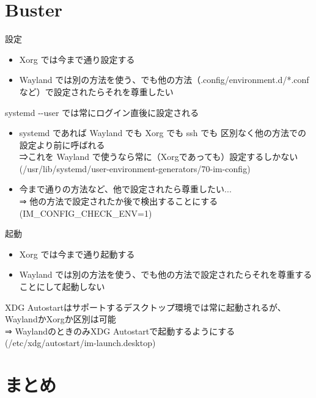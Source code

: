 \section{Buster}

\begin{frame}{設定}

\begin{itemize}
 \item Xorg では今まで通り設定する
 \item Wayland では別の方法を使う、でも他の方法（.config/environment.d/*.confなど）で設定されたらそれを尊重したい
\end{itemize}
\pause

systemd -{}-user では常にログイン直後に設定される
\pause
\begin{itemize}
 \item 
systemd であれば
\pause
Wayland でも
\pause
Xorg でも
\pause
ssh でも
\pause
区別なく他の方法での設定より前に呼ばれる\\
\pause
⇒これを Wayland で使うなら常に（Xorgであっても）設定するしかない\\
(/usr/lib/systemd/user-environment-generators/70-im-config)
\\
\pause
 \item 
今まで通りの方法など、他で設定されたら尊重したい...\\
⇒ 他の方法で設定されたか後で検出することにする
(IM\_CONFIG\_CHECK\_ENV=1)
\end{itemize}

\end{frame}

\begin{frame}{起動}

\begin{itemize}
 \item Xorg では今まで通り起動する
 \item Wayland では別の方法を使う、でも他の方法で設定されたらそれを尊重することにして起動しない
\end{itemize}
\pause

XDG Autostartはサポートするデスクトップ環境では常に起動されるが、WaylandかXorgか区別は可能\\
\pause
⇒ WaylandのときのみXDG Autostartで起動するようにする\\
(/etc/xdg/autostart/im-launch.desktop)

\end{frame}

\section{まとめ}

